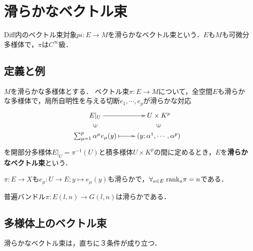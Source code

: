 \documentclass[uplatex,dvipdfmx]{jsreport}
\begin{document}
\section{滑らかなベクトル束}

\begin{tcolorbox}[colframe=ForestGreen, colback=ForestGreen!10!white,breakable,colbacktitle=ForestGreen!40!white,coltitle=black,fonttitle=\bfseries\sffamily,
title=]
    Diff内のベクトル束対象$pi:E\to M$を滑らかなベクトル束という．$E$も$M$も可微分多様体で，$\pi$は$C^\infty$級．
\end{tcolorbox}

\subsection{定義と例}

\begin{definition}[滑らかなベクトル束]
    $M$を滑らかな多様体とする．
    ベクトル束$\pi:E\to M$について，全空間$E$も滑らかな多様体で，局所自明性を与える切断$e_1,\cdots,e_p$が滑らかな対応
    \[\xymatrix@R-2pc{
        E|_U\ar[r]&U\times K^p\\
        \rotatebox[origin=c]{90}{$\in$}&\rotatebox[origin=c]{90}{$\in$}\\
        \sum^p_{\mu=1}\al^\mu e_\mu(y)\ar@{|->}[r]&(y;\al^1,\cdots,\al^p)
    }\]
    を開部分多様体$E|_{U}=\pi^{-1}(U)$と積多様体$U\times K^p$の間に定めるとき，$E$を\textbf{滑らかなベクトル束}という．
\end{definition}
\begin{remark}
    $\pi:E\to X$も$e_\mu:U\to E;y\mapsto e_\mu(y)$も滑らかで，$\forall_{a\in E}\;\mathrm{rank}_a\pi=n$である．
\end{remark}

\begin{example}
    普遍バンドル$\pi:E(l,n)\to G(l,n)$は滑らかである．
\end{example}

\subsection{多様体上のベクトル束}

\begin{tcolorbox}[colframe=ForestGreen, colback=ForestGreen!10!white,breakable,colbacktitle=ForestGreen!40!white,coltitle=black,fonttitle=\bfseries\sffamily,
title=]
    滑らかなベクトル束は，直ちに３条件が成り立つ．
\end{tcolorbox}
\end{document}
